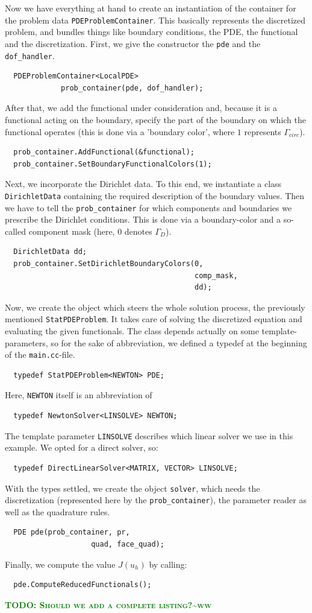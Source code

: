 \documentclass[smallextended]{svjour3}       %
\numberwithin{equation}{section}
\newcommand{\todoww}[1]{\textbf{\textsc{\textcolor{green}{TODO: #1\textasciitilde ww}}}}
\begin{document}
Now we have everything at hand to create an instantiation of the container for the problem data \texttt{PDEProblemContainer}. This basically represents the discretized problem, and bundles things like boundary conditions, the PDE, the functional and the discretization. First, we give the constructor the \texttt{pde} and the \texttt{dof\_handler}.
\begin{lstlisting}
  PDEProblemContainer<LocalPDE> 
             prob_container(pde, dof_handler);                                            
\end{lstlisting}
After that, we add the functional under consideration and, because it is a 
functional acting on the boundary, specify the part of the boundary on which 
the functional operates (this is done via a 'boundary color', where $1$ 
represents $\Gamma_{circ}$).
\begin{lstlisting}
  prob_container.AddFunctional(&functional);
  prob_container.SetBoundaryFunctionalColors(1);
\end{lstlisting}
Next, we incorporate the Dirichlet data. To this end, we instantiate a 
class \texttt{DirichletData} containing the required description of the 
boundary values. Then we have to tell the \texttt{prob\_container} for
which components and boundaries we prescribe the Dirichlet conditions. This is
done via a boundary-color and a so-called component mask 
(here, $0$ denotes $\Gamma_D$).
\begin{lstlisting}
  DirichletData dd;
  prob_container.SetDirichletBoundaryColors(0,
                                            comp_mask,
                                            dd);
\end{lstlisting}
Now, we create the object which steers the whole solution process, the previously mentioned \texttt{StatPDEProblem}. It takes care of solving the discretized equation and evaluating the given functionals. The class depends actually on some template-parameters, so for the sake of abbreviation, we defined a typedef at the beginning of the \texttt{main.cc}-file.
\begin{lstlisting}
  typedef StatPDEProblem<NEWTON> PDE;
\end{lstlisting}
Here, \texttt{NEWTON} itself is an abbreviation of
\begin{lstlisting}
  typedef NewtonSolver<LINSOLVE> NEWTON;
\end{lstlisting}
The  template parameter \texttt{LINSOLVE} describes which linear solver we use in this example. We opted for a direct solver, so: 
\begin{lstlisting}
  typedef DirectLinearSolver<MATRIX, VECTOR> LINSOLVE;
\end{lstlisting}
With the types settled, we create the object \texttt{solver}, which needs the discretization (represented here by the \texttt{prob\_container}), the parameter reader as well as the quadrature rules.
\begin{lstlisting}
  PDE pde(prob_container, pr,
                    quad, face_quad);
\end{lstlisting}
Finally, we compute the value $J(u_h)$ by calling:
\begin{lstlisting}
  pde.ComputeReducedFunctionals();
\end{lstlisting}
\todoww{Should we add a complete listing?}
\end{document}
